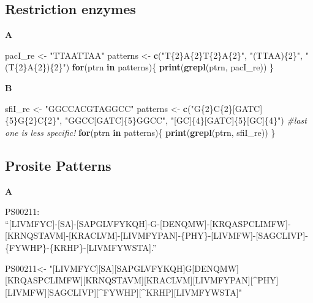 \documentclass[]{book}
\newenvironment{Shaded}{\begin{snugshade}}{\end{snugshade}}
\newcommand{\CommentTok}[1]{\textcolor[rgb]{0.56,0.35,0.01}{\textit{#1}}}
\newcommand{\ControlFlowTok}[1]{\textcolor[rgb]{0.13,0.29,0.53}{\textbf{#1}}}
\newcommand{\KeywordTok}[1]{\textcolor[rgb]{0.13,0.29,0.53}{\textbf{#1}}}
\newcommand{\NormalTok}[1]{#1}
\newcommand{\StringTok}[1]{\textcolor[rgb]{0.31,0.60,0.02}{#1}}
\begin{document}
\hypertarget{restriction-enzymes-2}{%
\subsection{Restriction enzymes}\label{restriction-enzymes-2}}

\textbf{A}

\begin{Shaded}
\begin{Highlighting}[]
\NormalTok{pacI_re <-}\StringTok{ "TTAATTAA"}
\NormalTok{patterns <-}\StringTok{ }\KeywordTok{c}\NormalTok{(}\StringTok{"T\{2\}A\{2\}T\{2\}A\{2\}"}\NormalTok{,}
           \StringTok{"(TTAA)\{2\}"}\NormalTok{, }
           \StringTok{"(T\{2\}A\{2\})\{2\}"}\NormalTok{)}
\ControlFlowTok{for}\NormalTok{(ptrn }\ControlFlowTok{in}\NormalTok{ patterns)\{}
    \KeywordTok{print}\NormalTok{(}\KeywordTok{grepl}\NormalTok{(ptrn, pacI_re))}
\NormalTok{\}}
\end{Highlighting}
\end{Shaded}

\textbf{B}

\begin{Shaded}
\begin{Highlighting}[]
\NormalTok{sfiI_re <-}\StringTok{ "GGCCACGTAGGCC"}
\NormalTok{patterns <-}\StringTok{ }\KeywordTok{c}\NormalTok{(}\StringTok{"G\{2\}C\{2\}[GATC]\{5\}G\{2\}C\{2\}"}\NormalTok{,}
           \StringTok{"GGCC[GATC]\{5\}GGCC"}\NormalTok{, }
           \StringTok{"[GC]\{4\}[GATC]\{5\}[GC]\{4\}"}\NormalTok{) }\CommentTok{#last one is less specific!}
\ControlFlowTok{for}\NormalTok{(ptrn }\ControlFlowTok{in}\NormalTok{ patterns)\{}
    \KeywordTok{print}\NormalTok{(}\KeywordTok{grepl}\NormalTok{(ptrn, sfiI_re))}
\NormalTok{\}}
\end{Highlighting}
\end{Shaded}

\hypertarget{prosite-patterns-2}{%
\subsection{Prosite Patterns}\label{prosite-patterns-2}}

\textbf{A}

PS00211:\\
``{[}LIVMFYC{]}-{[}SA{]}-{[}SAPGLVFYKQH{]}-G-{[}DENQMW{]}-{[}KRQASPCLIMFW{]}-{[}KRNQSTAVM{]}-{[}KRACLVM{]}-{[}LIVMFYPAN{]}-\{PHY\}-{[}LIVMFW{]}-{[}SAGCLIVP{]}-\{FYWHP\}-\{KRHP\}-{[}LIVMFYWSTA{]}.''

\begin{Shaded}
\begin{Highlighting}[]
\NormalTok{PS00211<-}\StringTok{ "[LIVMFYC][SA][SAPGLVFYKQH]G[DENQMW][KRQASPCLIMFW][KRNQSTAVM][KRACLVM][LIVMFYPAN][^PHY][LIVMFW][SAGCLIVP][^FYWHP][^KRHP][LIVMFYWSTA]"}
\end{Highlighting}
\end{Shaded}
\end{document}
